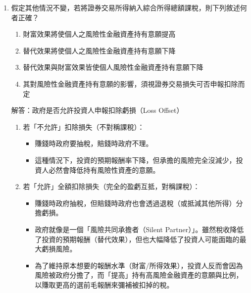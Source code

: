 \documentclass[12pt, a4paper]{article}
\begin{document}
\begin{enumerate}
    \item 假定其他情況不變，若將證券交易所得納入綜合所得總額課稅，則下列敘述何者正確？
    \begin{enumerate}[label=\Alph*.]
        \item 財富效果將使個人之風險性金融資產持有意願提高
        \item 替代效果將使個人之風險性金融資產持有意願下降
        \item 替代效果與財富效果皆使個人風險性金融資產持有意願下降
        \item 其對風險性金融資產持有意願的影響，須視證券交易損失可否申報扣除而定
    \end{enumerate}
    解答：政府是否允許投資人申報扣除虧損（Loss Offset）
    \begin{enumerate}[1.]
        \item 若「不允許」扣除損失（不對稱課稅）：
        \begin{itemize}
            \item 賺錢時政府要抽稅，賠錢時政府不理。
            \item 這種情況下，投資的預期報酬率下降，但承擔的風險完全沒減少，投資人必然會降低持有風險性資產的意願。
        \end{itemize}
        \item 若「允許」全額扣除損失（完全的盈虧互抵，對稱課稅）：
        \begin{itemize}
            \item 賺錢時政府抽稅，但賠錢時政府也會透過退稅（或抵減其他所得）分擔虧損。
            \item 政府就像是一個「風險共同承擔者（Silent Partner）」。雖然稅收降低了投資的預期報酬（替代效果），但也大幅降低了投資人可能面臨的最大虧損風險。
            \item 為了維持原本想要的報酬水準（財富/所得效果），投資人反而會因為風險被政府分擔了，而「提高」持有高風險金融資產的意願與比例，以賺取更高的選前毛報酬來彌補被扣掉的稅。
        \end{itemize}
    \end{enumerate}


\end{enumerate}
\end{document}
